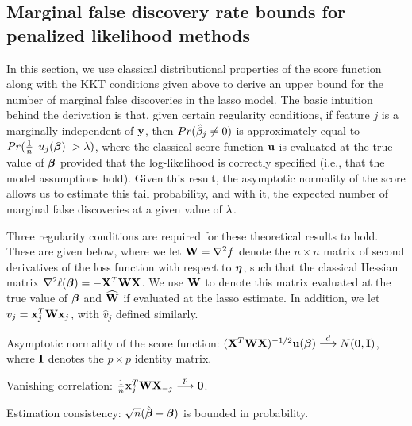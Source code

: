\subsection{Marginal false discovery rate bounds for penalized likelihood methods}
\label{Sec:main-results}

In this section, we use classical distributional properties of the score function along with the KKT conditions given above to derive an upper bound for the number of marginal false discoveries in the lasso model.
The basic intuition behind the derivation is that, given certain regularity conditions, if feature $j$ is a marginally independent of $\mathbf{y}$, then $Pr(\hat{\beta}_j \neq 0)$ is approximately equal to $Pr(\tfrac{1}{n}\left\lvert u_j(\boldsymbol{\beta})\right\rvert > \lambda)$, where the classical score function $\mathbf{u}$ is evaluated at the true value of $\boldsymbol{\beta}$ provided that the log-likelihood is correctly specified (i.e., that the model assumptions hold).
Given this result, the asymptotic normality of the score allows us to estimate this tail probability, and with it, the expected number of marginal false discoveries at a given value of $\lambda$.

Three regularity conditions are required for these theoretical results to hold.
These are given below, where we let $\mathbf{W} = \nabla^2f$ denote the $n \times n$
matrix of second derivatives of the loss function with respect to $\boldsymbol{\eta}$, such
that the classical Hessian matrix $\nabla^2 \ell (\boldsymbol{\beta}) = -\mathbf{X}^T\mathbf{W}\mathbf{X}$.  We use
$\mathbf{W}$ to denote this matrix evaluated at the true value of $\boldsymbol{\beta}$ and $\widehat{\mathbf{W}}$
if evaluated at the lasso estimate.  In addition, we let $v_j=\mathbf{x}_j^T\mathbf{W}\mathbf{x}_j$,
with $\hat{v}_j$ defined similarly.

\begin{description}[labelindent=0.5cm, leftmargin=*]
\item [(A1)] Asymptotic normality of the score function: $(\mathbf{X}^T\mathbf{W}\mathbf{X})^{-1/2}\mathbf{u}(\boldsymbol{\beta}) \overset{d}{\longrightarrow} N(\mathbf{0},  \mathbf{I})$, where $\mathbf{I}$ denotes the $p \times p$ identity matrix.
\item [(A2)] Vanishing correlation: $\frac{1}{n}\mathbf{x}_j^T\mathbf{W}\mathbf{X}_{-j} \overset{p}{\longrightarrow} \mathbf{0}$.
\item [(A3)] Estimation consistency: $\sqrt{n}(\hat{\boldsymbol{\beta}}-  \boldsymbol{\beta})$ is bounded in probability.
\end{description}

